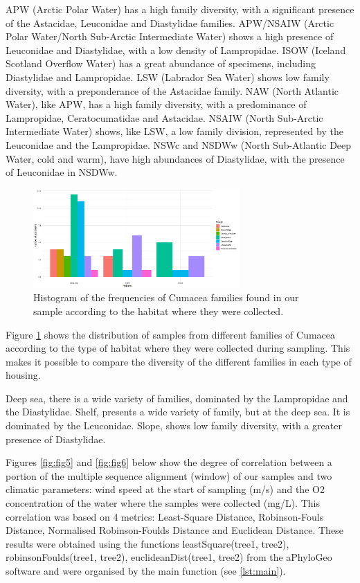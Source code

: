 APW (Arctic Polar Water) has a high family diversity, with a significant presence of the Astacidae, Leuconidae and Diastylidae families. APW/NSAIW (Arctic Polar Water/North Sub-Arctic Intermediate Water) shows a high presence of Leuconidae and Diastylidae, with a low density of Lampropidae. ISOW (Iceland Scotland Overflow Water) has a great abundance of specimens, including Diastylidae and Lampropidae. LSW (Labrador Sea Water) shows low family diversity, with a preponderance of the Astacidae family. NAW (North Atlantic Water), like APW, has a high family diversity, with a predominance of Lampropidae, Ceratocumatidae and Astacidae. NSAIW (North Sub-Arctic Intermediate Water) shows, like LSW, a low family division, represented by the Leuconidae and the Lampropidae. NSWc and NSDWw (North Sub-Atlantic Deep Water, cold and warm), have high abundances of Diastylidae, with the presence of Leuconidae in NSDWw.

\begin{figure}[]
    \centering
    \includegraphics[width=0.7\textwidth]{figure4.png}
    \caption{Histogram of the frequencies of Cumacea families found in our sample according to the habitat where they were collected.\label{fig:fig4}}
\end{figure}

Figure \ref{fig:fig4} shows the distribution of samples from different families of Cumacea according to the type of habitat where they were collected during sampling. This makes it possible to compare the diversity of the different families in each type of housing.

Deep sea, there is a wide variety of families, dominated by the Lampropidae and the Diastylidae. Shelf, presents a wide variety of family, but at the deep sea. It is dominated by the Leuconidae. Slope, shows low family diversity, with a greater presence of Diastylidae. 

Figures \ref{fig:fig5} and \ref{fig:fig6} below show the degree of correlation between a portion of the multiple sequence alignment (window) of our samples and two climatic parameters: wind speed at the start of sampling (m/s) and the O2 concentration of the water where the samples were collected (mg/L). This correlation was based on 4 metrics: Least-Square Distance, Robinson-Fouls Distance, Normalised Robinson-Foulds Distance and Euclidean Distance. These results were obtained using the functions leastSquare(tree1, tree2), robinsonFoulds(tree1, tree2), euclideanDist(tree1, tree2) from the aPhyloGeo software and were organised by the main function (see \autoref{lst:main}). 

